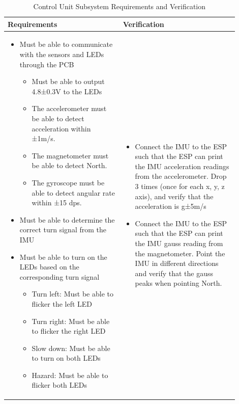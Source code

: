 \documentclass[12pt]{article}
\begin{document}
    \begin{table}[h]
        \centering
        \caption{Control Unit Subsystem Requirements and Verification}
        \begin{tabular}{p{0.45\linewidth}p{0.45\linewidth}}
        \toprule
        \textbf{Requirements} & \textbf{Verification} \\
        \midrule
        \begin{itemize}[leftmargin=*, nosep, after=\strut]
            \item Must be able to communicate with the sensors and LEDs through the PCB
            \begin{itemize}[nosep]
                \item Must be able to output 4.8±0.3V to the LEDs
                \item The accelerometer must be able to detect acceleration within ±1m/s.
                \item The magnetometer must be able to detect North.
                \item The gyroscope must be able to detect angular rate within ±15 dps.
            \end{itemize}
            \item Must be able to determine the correct turn signal from the IMU
            \item Must be able to turn on the LEDs based on the corresponding turn signal
            \begin{itemize}[nosep]
                \item Turn left: Must be able to flicker the left LED
                \item Turn right: Must be able to flicker the right LED
                \item Slow down: Must be able to turn on both LEDs
                \item Hazard: Must be able to flicker both LEDs
            \end{itemize}
        \end{itemize} &
        \begin{itemize}[leftmargin=*, nosep, after=\strut]
            \item Connect the IMU to the ESP such that the ESP can print the IMU acceleration readings from the accelerometer. Drop 3 times (once for each x, y, z axis), and verify that the acceleration is g±5m/s
            \item Connect the IMU to the ESP such that the ESP can print the IMU gauss reading from the magnetometer. Point the IMU in different directions and verify that the gauss peaks when pointing North.

\end{itemize}
\end{tabular}
\end{table}
\end{document}
